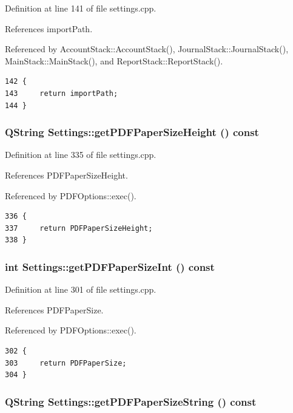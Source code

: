 Definition at line 141 of file settings.cpp.

References import\-Path.

Referenced by Account\-Stack::Account\-Stack(), Journal\-Stack::Journal\-Stack(), Main\-Stack::Main\-Stack(), and Report\-Stack::Report\-Stack().

\footnotesize\begin{verbatim}142 {
143     return importPath;
144 }
\end{verbatim}\normalsize 


\hypertarget{classSettings_a42}{
\subsubsection[getPDFPaperSizeHeight]{\setlength{\rightskip}{0pt plus 5cm}QString Settings::get\-PDFPaper\-Size\-Height () const}}
\label{classSettings_a42}


Definition at line 335 of file settings.cpp.

References PDFPaper\-Size\-Height.

Referenced by PDFOptions::exec().

\footnotesize\begin{verbatim}336 {
337     return PDFPaperSizeHeight;
338 }
\end{verbatim}\normalsize 


\hypertarget{classSettings_a37}{
\subsubsection[getPDFPaperSizeInt]{\setlength{\rightskip}{0pt plus 5cm}int Settings::get\-PDFPaper\-Size\-Int () const}}
\label{classSettings_a37}


Definition at line 301 of file settings.cpp.

References PDFPaper\-Size.

Referenced by PDFOptions::exec().

\footnotesize\begin{verbatim}302 {
303     return PDFPaperSize;
304 }
\end{verbatim}\normalsize 


\hypertarget{classSettings_a38}{
\subsubsection[getPDFPaperSizeString]{\setlength{\rightskip}{0pt plus 5cm}QString Settings::get\-PDFPaper\-Size\-String () const}}
\label{classSettings_a38}



